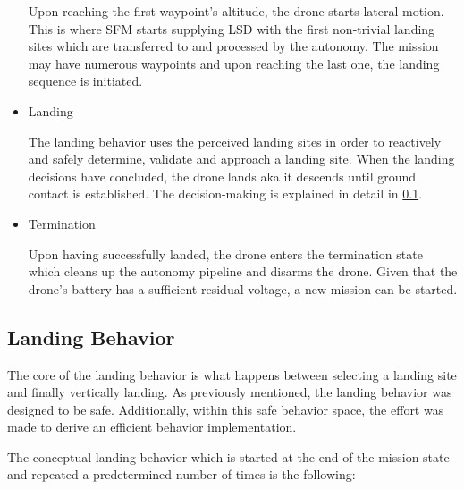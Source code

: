 \begin{itemize}
    Upon reaching the first waypoint's altitude, the drone starts lateral motion. This is where SFM starts supplying LSD with the first non-trivial landing sites which are transferred to and processed by the autonomy. The mission may have numerous waypoints and upon reaching the last one, the landing sequence is initiated.

    \item Landing
    
    The landing behavior uses the perceived landing sites in order to reactively and safely determine, validate and approach a landing site. When the landing decisions have concluded, the drone lands aka it descends until ground contact is established. The decision-making is explained in detail in \cref{subsec:landing_behavior}. 

    \item Termination

    Upon having successfully landed, the drone enters the termination state which cleans up the autonomy pipeline and disarms the drone. Given that the drone's battery has a sufficient residual voltage, a new mission can be started.
\end{itemize}

\subsection{Landing Behavior}\label{subsec:landing_behavior}

The core of the landing behavior is what happens between selecting a landing site and finally vertically landing. As previously mentioned, the landing behavior was designed to be safe. Additionally, within this safe behavior space, the effort was made to derive an efficient behavior implementation.

The conceptual landing behavior which is started at the end of the mission state and repeated a predetermined number of times is the following:

